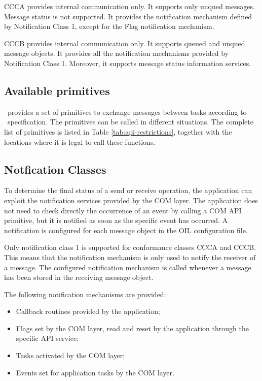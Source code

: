 CCCA provides internal communication only. It supports only unqued messages. 
Message status is not supported. It provides the notification mechanism defined 
by Notification Class 1, except for the Flag notification mechanism.

CCCB provides internal communication only. It supports queued and unqued message 
objects. It provides all the notification mechanisms provided by Notification 
Class 1. Moreover, it supports message status information services.

\subsection{Available primitives}
\ee\ provides a set of primitives to exchange messages between tasks according to 
\oc\ specification. The primitives can be called in different situations. 
The complete list of primitives is listed in Table \ref{tab:api-restrictions}, 
together with the locations where it is legal to call these functions.



\subsection{Notfication Classes}
To determine the final status of a send or receive operation, the application can
exploit the notification services provided by the COM layer. The application does 
not need to check directly the occurrence of an event by calling a COM API primitive, 
but it is notified as soon as the specific event has occurred. A notification is
configured for each message object in the OIL configuration file.


Only notification class 1 is supported for conformance classes CCCA and CCCB. 
This means that the notification mechanism is only used to notify the receiver 
of a message. The configured notification mechanism is called whenever a message 
has been stored in the receiving message object.


The following notification mechanisms are provided:
\begin{itemize}
\item Callback routines provided by the application;
\item Flags set by the COM layer, read and reset by the application through 
the specific API service;
\item Tasks activated by the COM layer;
\item Events set for application tasks by the COM layer.
\end{itemize}


